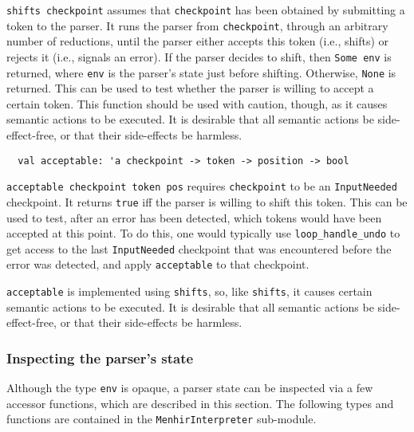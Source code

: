 \documentclass[onecolumn,11pt,nocopyrightspace,preprint]{sigplanconf}
\begin{document}
\verb+shifts checkpoint+ assumes that \verb+checkpoint+ has been obtained by
submitting a token to the parser. It runs the parser from \verb+checkpoint+,
through an arbitrary number of reductions, until the parser either accepts
this token (i.e., shifts) or rejects it (i.e., signals an error). If the
parser decides to shift, then \verb+Some env+ is returned, where \verb+env+ is
the parser's state just before shifting. Otherwise, \verb+None+ is returned.
This can be used to test whether the parser is willing to accept a certain
token. This function should be used with caution, though, as it causes
semantic actions to be executed. It is desirable that all semantic actions be
side-effect-free, or that their side-effects be harmless.


\begin{verbatim}
  val acceptable: 'a checkpoint -> token -> position -> bool
\end{verbatim}

\verb+acceptable checkpoint token pos+ requires \verb+checkpoint+ to be an
\verb+InputNeeded+ checkpoint. It returns \verb+true+ iff the parser is
willing to shift this token.
%
This can be used to test, after an error has been detected, which tokens would
have been accepted at this point. To do this, one would typically use
\verb+loop_handle_undo+ to get access to the last \verb+InputNeeded+
checkpoint that was encountered before the error was detected, and apply
\verb+acceptable+ to that checkpoint.

\verb+acceptable+ is implemented using \verb+shifts+, so, like \verb+shifts+,
it causes certain semantic actions to be executed. It is desirable that all
semantic actions be side-effect-free, or that their side-effects be harmless.


\subsubsection{Inspecting the parser's state}
\label{sec:incremental:inspecting}

Although the type \verb+env+ is opaque, a parser state can be inspected via a
few accessor functions, which are described in this section. The following
types and functions are contained in the \verb+MenhirInterpreter+ sub-module.

\end{document}
